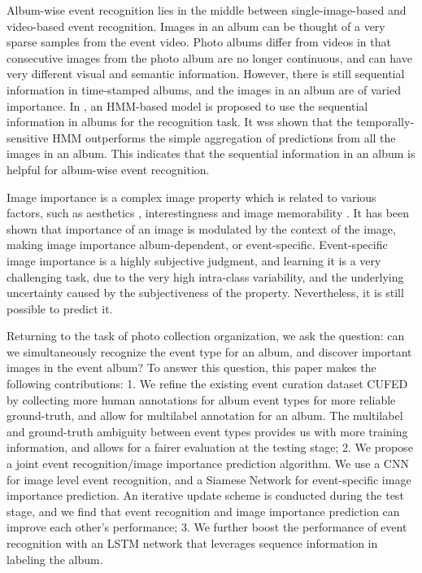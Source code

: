 \documentclass[runningheads]{llncs}
\begin{document}
Album-wise event recognition lies in the middle between single-image-based and video-based event recognition. Images in an album can be thought of a very sparse samples from the event video. Photo albums differ from videos in that consecutive images from the photo album are no longer continuous, and can have very different visual and semantic information. However, there is still sequential information in time-stamped albums, and the images in an album are of varied importance. In \cite{HMM}, an HMM-based model is proposed to use the sequential information in albums for the recognition task. It wss shown that the temporally-sensitive HMM outperforms the simple aggregation of predictions from all the images in an album. This indicates that the sequential information in an album is helpful for  album-wise event recognition.

Image importance is a complex image property which is related to various factors, such as aesthetics \cite{aesthe_14}, interestingness \cite{interesting} and image memorability \cite{Isola2011}. It has been shown \cite{CVPR} that importance of an image is modulated by the context of the image, making image importance album-dependent, or event-specific. Event-specific image importance is a highly subjective judgment, and learning it is a very challenging task, due to the very high intra-class variability, and the underlying uncertainty caused by the subjectiveness of the property. Nevertheless, it is still possible to predict it. 

Returning to the task of photo collection organization, we ask the question: can we simultaneously recognize the event type for an album, and discover important images in the event album? To answer this question, this paper makes the following contributions: 1. We refine the existing event curation dataset CUFED by collecting more human annotations for album event types for more reliable ground-truth, and allow for multilabel annotation for an album. The multilabel and ground-truth ambiguity between event types provides us with more training information, and allows for a fairer evaluation at the testing stage; 2. We propose a joint event recognition/image importance prediction algorithm. We use a CNN for image level event recognition, and a Siamese Network for event-specific image importance prediction. An iterative update scheme is conducted during the test stage, and we find that event recognition and image importance prediction can improve each other's performance; 3. We further boost the performance of event recognition with an LSTM network that leverages sequence information in labeling the album.
\end{document}
